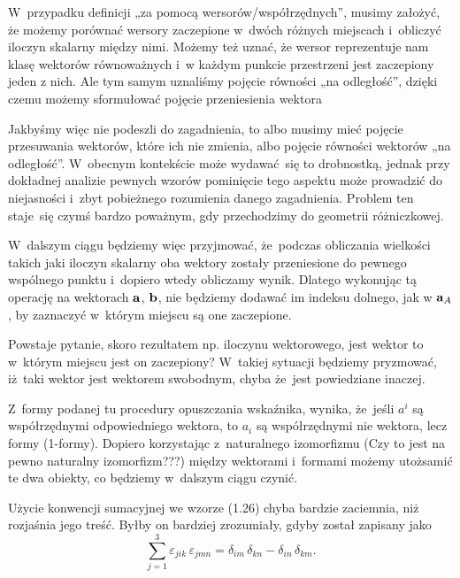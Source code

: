 \documentclass[a4paper,11pt]{article}
\begin{document}
W~przypadku definicji „za pomocą wersorów/współrzędnych”, musimy założyć, że
możemy porównać wersory zaczepione w~dwóch różnych miejscach i~obliczyć
iloczyn skalarny między nimi. Możemy też uznać, że wersor reprezentuje nam
klasę wektorów równoważnych i~w każdym punkcie przestrzeni jest zaczepiony
jeden z nich. Ale tym samym uznaliśmy pojęcie równości „na odległość”,
dzięki czemu możemy sformułować pojęcie przeniesienia wektora

Jakbyśmy więc nie podeszli do zagadnienia, to albo musimy mieć pojęcie
przesuwania wektorów, które ich nie zmienia, albo pojęcie równości wektorów
„na odległość”. W~obecnym kontekście może wydawać~się to drobnostką, jednak
przy dokładnej analizie pewnych wzorów pominięcie tego aspektu może
prowadzić do niejasności i~zbyt pobieżnego rozumienia danego zagadnienia.
Problem ten staje~się czymś bardzo poważnym, gdy przechodzimy do geometrii
różniczkowej.

W~dalszym ciągu będziemy więc przyjmować, że~podczas obliczania wielkości
takich jaki iloczyn skalarny oba wektory zostały przeniesione do pewnego
wspólnego punktu i~dopiero wtedy obliczamy wynik. Dlatego wykonując tą
operację na wektorach $\mathbf{a}$, $\mathbf{b}$, nie będziemy dodawać im
indeksu dolnego, jak w $\mathbf{a}_{ A }$, by zaznaczyć w~którym miejscu są
one zaczepione.

Powstaje pytanie, skoro rezultatem np. iloczynu wektorowego, jest wektor to
w~którym miejscu jest on zaczepiony? W~takiej sytuacji będziemy pryzmować,
iż~taki wektor jest wektorem swobodnym, chyba że~jest powiedziane inaczej.

\vspace{\spaceFour}





\noindent
{} Z~formy podanej tu procedury opuszczania wskaźnika, wynika,
że~jeśli $a^{ i }$ są współrzędnymi odpowiedniego wektora, to $a_{ i }$ są
współrzędnymi nie wektora, lecz formy (1-formy). Dopiero korzystając
z~naturalnego izomorfizmu (Czy to jest na pewno naturalny izomorfizm???)
między wektorami i~formami możemy utożsamić te dwa obiekty, co będziemy
w~dalszym ciągu czynić.

\vspace{\spaceFour}





\noindent
{} Użycie konwencji sumacyjnej we wzorze (1.26) chyba bardzie
zaciemnia, niż rozjaśnia jego treść. Byłby on bardziej zrozumiały, gdyby
został zapisany jako
\begin{equation}
  \label{eq:SkalmierskiMechanika-06}
  \sum_{ j = 1 }^{ 3 } \varepsilon_{ j i k } \, \varepsilon_{ j m n }
  = \delta_{ i m } \, \delta_{ k n } - \delta_{ i n } \, \delta_{ k m }.
\end{equation}
\end{document}
